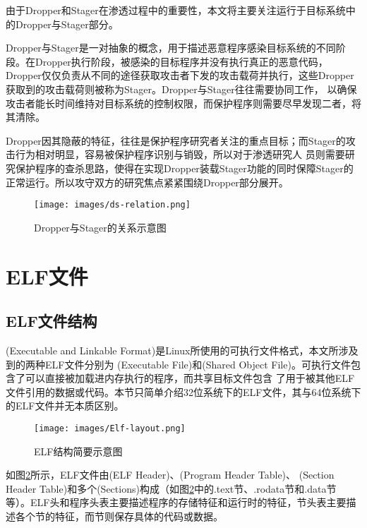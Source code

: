 由于Dropper和Stager在渗透过程中的重要性，本文将主要关注运行于目标系统中的Dropper与Stager部分。

Dropper与Stager是一对抽象的概念，用于描述恶意程序感染目标系统的不同阶段。在Dropper执行阶段，被感染的目标程序并没有执行真正的恶意代码，
Dropper仅仅负责从不同的途径获取攻击者下发的攻击载荷并执行，这些Dropper获取到的攻击载荷则被称为Stager。Dropper与Stager往往需要协同工作，
以确保攻击者能长时间维持对目标系统的控制权限，而保护程序则需要尽早发现二者，将其清除。

Dropper因其隐蔽的特征，往往是保护程序研究者关注的重点目标；而Stager的攻击行为相对明显，容易被保护程序识别与销毁，所以对于渗透研究人
员则需要研究保护程序的查杀思路，使得在实现Dropper装载Stager功能的同时保障Stager的正常运行。所以攻守双方的研究焦点紧紧围绕Dropper部分展开。

\begin{figure}[h]
    \centering
    \texttt{[image: images/ds-relation.png]}
    \caption{Dropper与Stager的关系示意图}
    \label{FIG-ds-relation}
\end{figure}

\section{ELF文件}
\label{SEC-ELF}

\subsection{ELF文件结构}
\label{SEC-ELF-Structure}

(Executable and Linkable Format)是Linux所使用的可执行文件格式，本文所涉及到的两种ELF文件分别为
(Executable File)和(Shared Object File)。可执行文件包含了可以直接被加载进内存执行的程序，而共享目标文件包含
了用于被其他ELF文件引用的数据或代码。本节只简单介绍32位系统下的ELF文件，其与64位系统下的ELF文件并无本质区别。

\begin{figure}[h]
    \centering
    \texttt{[image: images/Elf-layout.png]}
    \caption{ELF结构简要示意图}
    \label{FIG-ELF-layout}
\end{figure}

如图\ref{FIG-ELF-layout}所示，ELF文件由(ELF Header)、(Program Header Table)、
(Section Header Table)和多个(Sections)构成（如图\ref{FIG-ELF-layout}中的.text节、.rodata节和.data节
等）。ELF头和程序头表主要描述程序的存储特征和运行时的特征，节头表主要描述各个节的特征，而节则保存具体的代码或数据。

